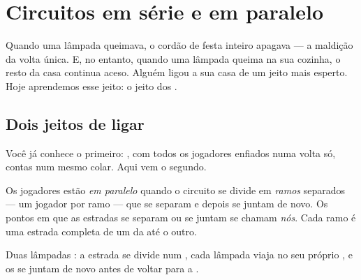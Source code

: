 \chapter{Circuitos em série e em paralelo}\label{ch:g5:series-parallel-circuits}

Quando uma lâmpada queimava, o cordão de festa inteiro apagava --- a
maldição da volta única. E, no entanto, quando uma lâmpada queima na
sua cozinha, o resto da casa continua aceso. Alguém ligou a sua casa
de um jeito mais esperto. Hoje aprendemos esse jeito: o jeito dos
.

\section{Dois jeitos de ligar}

Você já conhece o primeiro: \emph{}, com todos os jogadores
enfiados numa volta só, contas num mesmo colar. Aqui vem o segundo.

\begin{definition}[Em paralelo]\label{def:g5:series-parallel-circuits:parallel}
Os jogadores estão \emph{em paralelo}
quando o circuito se divide em \emph{ramos} separados ---
um jogador por ramo --- que se separam e depois se juntam de novo. Os
pontos em que as estradas se separam ou se juntam se chamam
\emph{nós}. Cada ramo é uma estrada completa de um 
da  até o outro.
\end{definition}

\begin{omfigure}

{\small Duas lâmpadas : a estrada se divide num , cada
lâmpada viaja no seu próprio , e os  se juntam de novo antes
de voltar para a .}
\end{omfigure}

